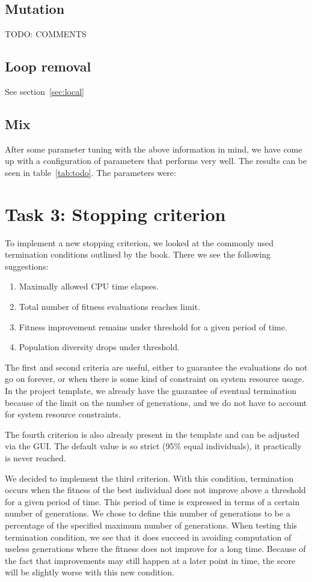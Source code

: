 \documentclass{report}
\begin{document}
\subsection{Mutation}
TODO: COMMENTS

\subsection{Loop removal}
See section~\ref{sec:local}

\subsection{Mix}
After some parameter tuning with the above information in mind, we have come up with a configuration of parameters that performs very well. The results can be seen in table~\ref{tab:todo}. The parameters were:



\section{Task 3: Stopping criterion}
To implement a new stopping criterion, we looked at the commonly used termination conditions outlined by the book. There we see the following suggestions:
\begin{enumerate}
	\item Maximally allowed CPU time elapses.
	\item Total number of fitness evaluations reaches limit.
	\item Fitness improvement remains under threshold for a given period of time.
	\item Population diversity drops under threshold.
\end{enumerate}
The first and second criteria are useful, either to guarantee the evaluations do not go on forever, or when there is some kind of constraint on system resource usage. In the project template, we already have the guarantee of eventual termination because of the limit on the number of generations, and we do not have to account for system resource constraints.

The fourth criterion is also already present in the template and can be adjusted via the GUI. The default value is so strict (95\% equal individuals), it practically is never reached.

We decided to implement the third criterion. With this condition, termination occurs when the fitness of the best individual does not improve above a threshold for a given period of time. This period of time is expressed in terms of a certain number of generations. We chose to define this number of generations to be a percentage of the specified maximum number of generations. When testing this termination condition, we see that it does succeed in avoiding computation of useless generations where the fitness does not improve for a long time. Because of the fact that improvements may still happen at a later point in time, the score will be slightly worse with this new condition.
\end{document}
